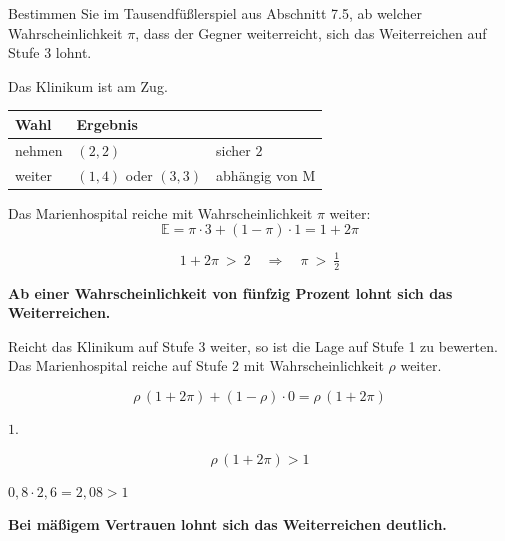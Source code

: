 \begin{aufgabe}
Bestimmen Sie im Tausendfüßlerspiel aus Abschnitt 7.5, ab welcher Wahrscheinlichkeit $\pi$, dass der Gegner weiterreicht, sich das Weiterreichen auf Stufe 3 lohnt.

\loesung
{}
Das Klinikum ist am Zug.
\begin{center}
{\small
\renewcommand{\arraystretch}{1.5}
\begin{tabular}{@{}P{2.2cm}P{2.4cm}P{3.0cm}@{}}
\toprule
\textbf{Wahl} & \textbf{Ergebnis} & \\
\midrule
nehmen & $(2,2)$ & sicher $2$\\
weiter & $(1,4)$ oder $(3,3)$ & abhängig von M\\
\bottomrule
\end{tabular}}
\end{center}

Das Marienhospital reiche mit Wahrscheinlichkeit $\pi$ weiter:
\[ \mathbb{E} = \pi\cdot3 + (1-\pi)\cdot1 = 1 + 2\pi \]

\[ 1+2\pi \ >\ 2 \quad\Longrightarrow\quad \pi \ >\ \tfrac12 \]

\begin{center}
\begin{minipage}{0.9\textwidth}
\textbf{Ab einer Wahrscheinlichkeit von fünfzig Prozent lohnt sich das Weiterreichen.}
\end{minipage}
\end{center}

Reicht das Klinikum auf Stufe 3 weiter, so ist die Lage auf Stufe 1 zu bewerten. Das Marienhospital reiche auf Stufe 2 mit Wahrscheinlichkeit $\rho$ weiter.

\[ \rho\,(1+2\pi) + (1-\rho)\cdot0 = \rho\,(1+2\pi) \]

 $1$.

\[ \rho\,(1+2\pi) > 1 \]

 $0{,}8\cdot2{,}6 = 2{,}08 > 1$ \checkmark

\begin{center}
\begin{minipage}{0.9\textwidth}
\textbf{Bei mäßigem Vertrauen lohnt sich das Weiterreichen deutlich.}
\end{minipage}
\end{center}


\end{aufgabe}
